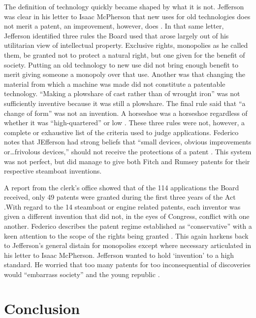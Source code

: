 \documentclass[pdftex,11pt,letterpaper]{article}
\begin{document}
The definition of technology quickly became shaped by what it is not. Jefferson was clear in his letter to Isaac McPherson that new uses for old technologies does not merit a patent, an improvement, however, does \autocite{Jefferson1813}. In that same letter, Jefferson identified three rules the Board used that arose largely out of his utilitarian view of intellectual property. Exclusive rights, monopolies as he called them, be granted not to protect a natural right, but one given for the benefit of society. Putting an old technology to new use did not bring enough benefit to merit giving someone a monopoly over that use. Another was that changing the material from which a machine was made did not constitute a patentable technology. ``Making a plowshare of cast rather than of wrought iron'' was not sufficiently inventive because it was still a plowshare. The final rule said that ``a change of form'' was not an invention. A horseshoe was a horseshoe regardless of whether it was ``high-quartered'' or low \autocite{Jefferson1813}. These three rules were not, however, a complete or exhaustive list of the criteria used to judge applications. Federico notes that JEfferson had strong beliefs that ``small devices, obvious improvements or\ldots frivolous devices,'' should not receive the protections of a patent \autocite[241]{Federico1936}. This system was not perfect, but did manage to give both Fitch and Rumsey patents for their respective steamboat inventions.

A report from the clerk's office showed that of the 114 applications the Board received, only 49 patents were granted during the first three years of the Act \autocite[246]{Federico1936}.With regard to the 14 steamboat or engine related patents, each inventor was given a different invention that did not, in the eyes of Congress, conflict with one another. Federico describes the patent regime established as ``conservative'' with a keen attention to the scope of the rights being granted \autocite[]{Federico1936}. This again harkens back to Jefferson's general distain for monopolies except where necessary articulated in his letter to Isaac McPherson. Jefferson wanted to hold `invention' to a high standard. He worried that too many patents for too inconsequential of discoveries would ``embarrass society'' and the young republic \autocite{Jefferson1813}.

\section{Conclusion}
\end{document}
